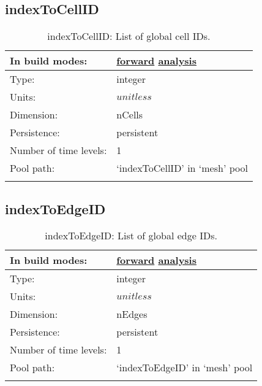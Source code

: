 \subsection[indexToCellID]{indexToCellID}
\label{subsec:var_sec_mesh_indexToCellID}
\begin{center}
\begin{longtable}{| p{2.0in} | p{4.0in} |}
        \hline 
        In build modes: & \hyperref[subsec:forward_var_tab_mesh]{forward} \hyperref[subsec:analysis_var_tab_mesh]{analysis} \\
        \hline 
        Type: & integer \\
        \hline 
        Units: & $unitless$ \\
        \hline 
        Dimension: & nCells \\
        \hline 
        Persistence: & persistent \\
        \hline 
        Number of time levels: & 1 \\
        \hline 
            Pool path: & `indexToCellID' in `mesh' pool \\
		 \hline 
    \caption{indexToCellID: List of global cell IDs.}
\end{longtable}
\end{center}
\subsection[indexToEdgeID]{indexToEdgeID}
\label{subsec:var_sec_mesh_indexToEdgeID}
\begin{center}
\begin{longtable}{| p{2.0in} | p{4.0in} |}
        \hline 
        In build modes: & \hyperref[subsec:forward_var_tab_mesh]{forward} \hyperref[subsec:analysis_var_tab_mesh]{analysis} \\
        \hline 
        Type: & integer \\
        \hline 
        Units: & $unitless$ \\
        \hline 
        Dimension: & nEdges \\
        \hline 
        Persistence: & persistent \\
        \hline 
        Number of time levels: & 1 \\
        \hline 
            Pool path: & `indexToEdgeID' in `mesh' pool \\
		 \hline 
    \caption{indexToEdgeID: List of global edge IDs.}
\end{longtable}
\end{center}
